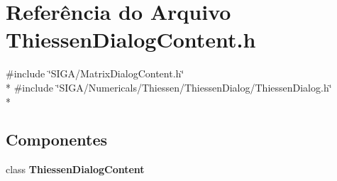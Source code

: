 \section{Referência do Arquivo Thiessen\+Dialog\+Content.\+h}
\label{_thiessen_dialog_content_8h}
{\ttfamily \#include \char`\"{}S\+I\+G\+A/\+Matrix\+Dialog\+Content.\+h\char`\"{}}\\*
{\ttfamily \#include \char`\"{}S\+I\+G\+A/\+Numericals/\+Thiessen/\+Thiessen\+Dialog/\+Thiessen\+Dialog.\+h\char`\"{}}\\*
\subsection*{Componentes}
\begin{DoxyCompactItemize}
\item 
class {\bf Thiessen\+Dialog\+Content}
\end{DoxyCompactItemize}

